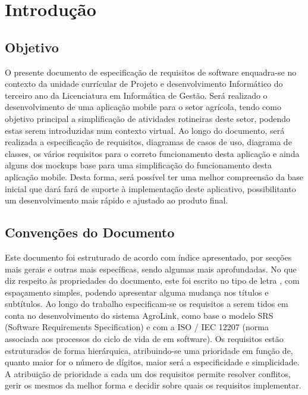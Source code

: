 \documentclass{scrreprt}
\begin{document}
	\tableofcontents
	
	\listoffigures
	
	\chapter{Introdução}
	
	\section{Objetivo }
	
	 O presente documento de especificação de requisitos de software enquadra-se no contexto da unidade currícular de Projeto e desenvolvimento Informático do terceiro ano da Licenciatura em Informática de Gestão. Será realizado o desenvolvimento de uma aplicação mobile para o setor agrícola, tendo como objetivo principal a simplificação de atividades rotineiras deste setor, podendo estas serem introduzidas num contexto virtual. Ao longo do documento, será realizada a especificação de requisitos, diagramas de casos de uso, diagrama de classes, os vários requisitos para o correto funcionamento desta aplicação e ainda alguns dos mockups base para uma simplificação do funcionamento desta aplicação mobile. Desta forma, será possível ter uma melhor compreensão da base inicial que dará fará de suporte à implementação deste aplicativo, possibilitanto um desenvolvimento mais rápido e ajustado ao produto final.
	
	\section{Convenções do Documento}
	
	Este documento foi estruturado de acordo com índice apresentado, por secções mais gerais e outras mais específicas, sendo algumas mais aprofundadas.
	No que diz respeito às propriedades do documento, este foi escrito no tipo de letra {\fontname\font}, com espaçamento simples, podendo apresentar alguma mudança nos títulos e subtítulos. Ao longo do trabalho especificam-se os requisitos a serem tidos em conta no desenvolvimento do sistema AgroLink,
	como base o modelo SRS (Software Requirements Specification) e com a ISO / IEC 12207 (norma associada aos processos do ciclo de vida de em software). Os requisitos estão estruturados de forma hierárquica, atribuindo-se uma prioridade em função de, quanto maior for o número de dígitos, maior será a 
	especificidade e simplicidade. A atribuição de prioridade a cada um dos requisitos permite resolver conflitos, gerir os mesmos da melhor forma e decidir sobre quais os requisitos 
	implementar.
	
\end{document}
